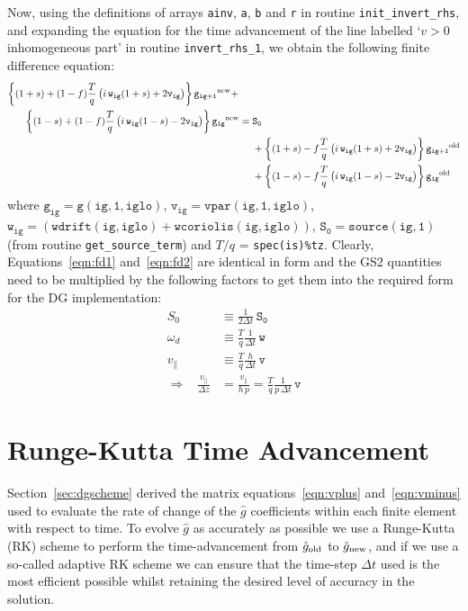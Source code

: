 \documentclass[10pt,a4paper]{article}
\begin{document}
Now, using the definitions of arrays \texttt{ainv}, \texttt{a}, \texttt{b} and
\texttt{r} in routine \texttt{init\_invert\_rhs}, and expanding the equation
for the time advancement of the line labelled `$v>0$ inhomogeneous part' in
routine \texttt{invert\_rhs\_1}, we obtain the following finite difference
equation:
\begin{align}
  \left\{ (1+s)+(1-f) \frac{T}{q} \left( i\, \mathtt{w_{ig}} (1+s) +
      2\mathtt{v_{ig}} \right) \right\} \mathtt{g_{ig+1}}^{\mbox{\scriptsize
      new}} + \;\;\;\;\; & \nonumber \\
  \left\{ (1-s)+(1-f) \frac{T}{q} \left( i\, \mathtt{w_{ig}} (1-s) -
      2\mathtt{v_{ig}} \right)
  \right\} \mathtt{g_{ig}}^{\mbox{\scriptsize new}} = {}& \mathtt{S_0} \nonumber \\
  & + \left\{ (1+s)-f \frac{T}{q} \left( i\,\mathtt{w_{ig}} (1+s) +
      2\mathtt{v_{ig}} \right)
  \right\} \mathtt{g_{ig+1}}^{\mbox{\scriptsize old}} \nonumber \\
  & + \left\{ (1-s)-f \frac{T}{q} \left( i\,\mathtt{w_{ig}} (1-s) -
      2\mathtt{v_{ig}} \right) \right\} \mathtt{g_{ig}}^{\mbox{\scriptsize
      old}}
\label{eqn:fd2}
\end{align}
where $\mathtt{g_{ig} = g(ig,1,iglo)}$, $\mathtt{v_{ig} = vpar(ig,1,iglo)}$,
$\mathtt{w_{ig} = (wdrift(ig,iglo) + wcoriolis(ig,iglo))}$, $\mathtt{S_0 =
  source(ig,1)}$ (from routine \texttt{get\_source\_term}) and $T/q$ =
\texttt{spec(is)\%tz}. Clearly, Equations~\ref{eqn:fd1} and~\ref{eqn:fd2} are
identical in form and the GS2 quantities need to be multiplied by the
following factors to get them into the required form for the DG
implementation:
\begin{align*}
S_0 & \equiv \frac{1}{2 \Delta t} \, \mathtt{S_0} \\
\omega_d & \equiv \frac{T}{q} \frac{1}{\Delta t} \, \mathtt{w} \\
v_\parallel & \equiv \frac{T}{q} \frac{h}{\Delta t} \, \mathtt{v} \\
\Longrightarrow \;\;\; \frac{v_\parallel}{\Delta z} & =
\frac{v_\parallel}{h\,p} = \frac{T}{q} \frac{1}{p\,\Delta t} \, \mathtt{v}
\end{align*}

\section{Runge-Kutta Time Advancement}
\label{sec:rk}

Section~\ref{sec:dgscheme} derived the matrix equations~\ref{eqn:vplus}
and~\ref{eqn:vminus} used to evaluate the rate of change of the $\hat{g}$
coefficients within each finite element with respect to time. To evolve
$\hat{g}$ as accurately as possible we use a Runge-Kutta (RK) scheme to
perform the time-advancement from $\hat{g}_{\mbox{\scriptsize old}}$ to
$\hat{g}_{\mbox{\scriptsize new}}$, and if we use a so-called adaptive RK
scheme we can ensure that the time-step $\Delta t$ used is the most efficient
possible whilst retaining the desired level of accuracy in the solution.
\end{document}
